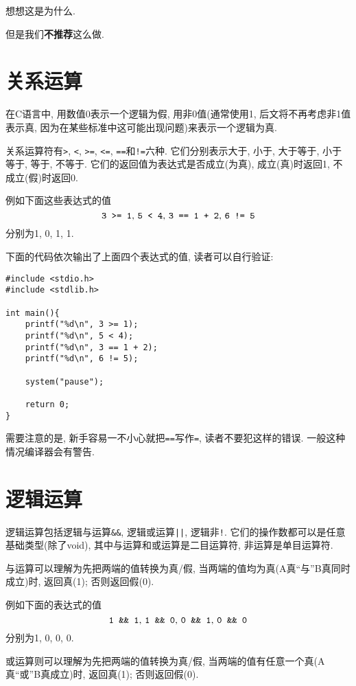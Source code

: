         想想这是为什么.

        但是我们\textbf{不推荐}这么做.

    \section{关系运算}
        在C语言中, 用数值0表示一个逻辑为假, 用非0值(通常使用1, 后文将不再考虑非1值表示真, 因为在某些标准中这可能出现问题)来表示一个逻辑为真.

        关系运算符有\texttt{>}, \texttt{<}, \texttt{>=}, \texttt{<=}, \texttt{==}和\texttt{!=}六种. 它们分别表示大于, 小于, 大于等于, 小于等于, 等于, 不等于. 它们的返回值为表达式是否成立(为真), 成立(真)时返回1, 不成立(假)时返回0.
        
        例如下面这些表达式的值
            \[\mbox{\texttt{3 >= 1},  \texttt{5 < 4},  \texttt{3 == 1 + 2},  \texttt{6 != 5}} \]
        分别为1, 0, 1, 1.

        下面的代码依次输出了上面四个表达式的值, 读者可以自行验证:
\begin{lstlisting}
#include <stdio.h>
#include <stdlib.h>
    
int main(){
    printf("%d\n", 3 >= 1);
    printf("%d\n", 5 < 4);
    printf("%d\n", 3 == 1 + 2);
    printf("%d\n", 6 != 5);

    system("pause");

    return 0;
}
\end{lstlisting}

        需要注意的是, 新手容易一不小心就把\texttt{==}写作\texttt{=}, 读者不要犯这样的错误. 一般这种情况编译器会有警告.

    \section{逻辑运算}
        逻辑运算包括逻辑与运算\texttt{\&\&}, 逻辑或运算\texttt{||}, 逻辑非\texttt{!}. 它们的操作数都可以是任意基础类型(除了void), 其中与运算和或运算是二目运算符, 非运算是单目运算符.

        与运算可以理解为先把两端的值转换为真/假, 当两端的值均为真(A真``与''B真同时成立)时, 返回真(1); 否则返回假(0).

        例如下面的表达式的值
            \[ \mbox{\texttt{1 \&\& 1},  \texttt{1 \&\& 0},  \texttt{0 \&\& 1},  \texttt{0 \&\& 0}} \]
        分别为1, 0, 0, 0.

        或运算则可以理解为先把两端的值转换为真/假, 当两端的值有任意一个真(A真``或''B真成立)时, 返回真(1); 否则返回假(0).

